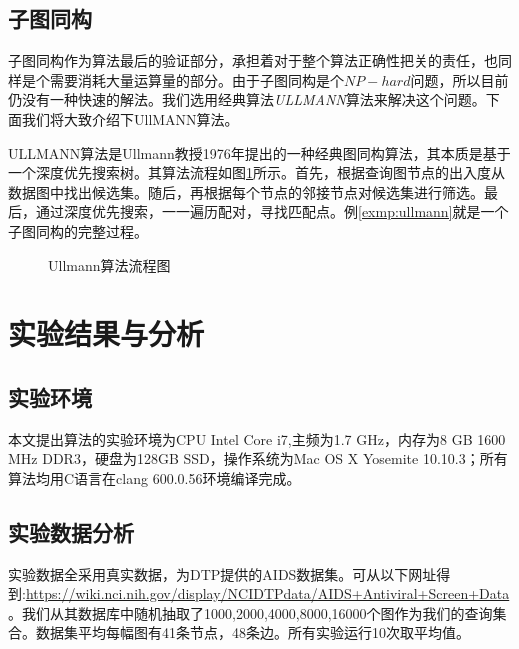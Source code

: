 \documentclass{XDBAthesis}
\numberwithin{algorithm}{chapter}
\begin{document}
\subsection{子图同构}
子图同构作为算法最后的验证部分，承担着对于整个算法正确性把关的责任，也同样是个需要消耗大量运算量的部分。由于子图同构是个$NP-hard$问题，所以目前仍没有一种快速的解法。我们选用经典算法\emph{ULLMANN}算法\cite{ullmann}来解决这个问题。下面我们将大致介绍下UllMANN算法。

ULLMANN算法是Ullmann教授1976年提出的一种经典图同构算法，其本质是基于一个深度优先搜索树。其算法流程如图\ref{fg:ullmanchart}所示。首先，根据查询图节点的出入度从数据图中找出候选集。随后，再根据每个节点的邻接节点对候选集进行筛选。最后，通过深度优先搜索，一一遍历配对，寻找匹配点。例\ref{exmp:ullmann}就是一个子图同构的完整过程。
\begin{figure}
    \caption{Ullmann算法流程图}
    \label{fg:ullmanchart}
\end{figure}
\begin{exmp}
    \label{exmp:ullmann}    
\end{exmp}


\section{实验结果与分析}
\subsection{实验环境}
本文提出算法的实验环境为CPU Intel Core i7,主频为1.7 GHz，内存为8 GB 1600 MHz DDR3，硬盘为128GB SSD，操作系统为Mac OS X Yosemite 10.10.3；所有算法均用C语言在clang 600.0.56环境编译完成。
\subsection{实验数据分析}
实验数据全采用真实数据，为DTP提供的AIDS数据集。可从以下网址得到:\url{https://wiki.nci.nih.gov/display/NCIDTPdata/AIDS+Antiviral+Screen+Data}。我们从其数据库中随机抽取了1000,2000,4000,8000,16000个图作为我们的查询集合。数据集平均每幅图有41条节点，48条边。所有实验运行10次取平均值。
\end{document}
